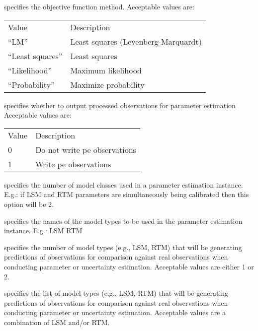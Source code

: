   specifies the objective function
 method.
 Acceptable values are:

 \begin{tabular}{ll}
 Value             & Description                         \\
 
 ``LM''            & Least squares (Levenberg-Marquardt) \\
 
 ``Least squares'' & Least squares                       \\
 ``Likelihood''    & Maximum likelihood                  \\
 ``Probability''   & Maximize probability                \\
 \end{tabular}

  specifies whether to output processed
 observations for parameter estimation
 Acceptable values are:

 \begin{tabular}{ll}
 Value & Description                  \\
 0     & Do not write pe observations \\
 1     & Write pe observations        \\
 \end{tabular}

 specifies the number of model classes used in a parameter estimation
 instance.  E.g.: if LSM and RTM parameters are simultaneously being
 calibrated then this option will be 2.

  specifies the
 names of the model types to be used in the parameter estimation
 instance.  E.g.: LSM RTM

 specifies the number of model types (e.g., LSM, RTM) that will be
 generating predictions of observations for comparison against real
 observations when conducting parameter or uncertainty estimation.
 Acceptable values are either 1 or 2.

 specifies the list of model types (e.g., LSM, RTM) that will be
 generating predictions of observations for comparison against real
 observations when conducting parameter or uncertainty estimation.
 Acceptable values are a combination of LSM and/or RTM.

